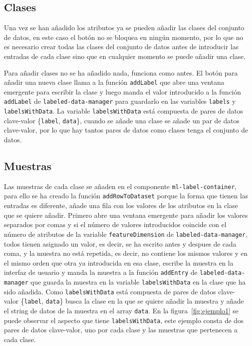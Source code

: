 \documentclass[a4paper, 12pt]{book}
\begin{document}
\subsection{Clases}
\label{subsec:clases}

Una vez se han añadido los atributos ya se pueden añadir las clases del conjunto de datos, en este caso el botón no se bloquea en ningún momento, por lo que no es necesario crear todas las clases del conjunto de datos antes de introducir las entradas de cada clase sino que en cualquier momento se puede añadir una clase. 

Para añadir clases no se ha añadido nada, funciona como antes. 
El botón para añadir una nueva clase llama a la función \texttt{addLabel} que abre una ventana emergente para escribir la clase y luego manda el valor introducido a la función \texttt{addLabel} de \texttt{labeled-data-manager} para guardarlo en las variables \texttt{labels} y \texttt{labelsWithData}. 
La variable \texttt{labelsWithData} está compuesta de pares de datos clave-valor \{\texttt{label}, \texttt{data}\}, cuando se añade una clase se añade un par de datos clave-valor, por lo que hay tantos pares de datos como clases tenga el conjunto de datos.

\subsection{Muestras}
\label{subsec:datos}

Las muestras de cada clase se añaden en el componente \texttt{ml-label-container}, para ello se ha creado la función \texttt{addRowToDataset} porque la forma que tienen las entradas es diferente, añade una fila con los valores de los atributos en la clase que se quiere añadir. 
Primero abre una ventana emergente para añadir los valores separados por comas y si el número de valores introducidos coincide con el número de atributos de la variable \texttt{featureDimension} de \texttt{labeled-data-manager}, todos tienen asignado un valor, es decir, se ha escrito antes y despues de cada coma, y la muestra no está repetida, es decir, no contiene los mismos valores y en el mismo orden que otra ya introducida en esa clase, escribe la muestra en la interfaz de usuario y manda la muestra a la función \texttt{addEntry} de \texttt{labeled-data-manager} que guarda la muestra en la variable \texttt{labelsWithData} en la clase que ha sido añadida. Como \texttt{labelsWithData} está compuesta de pares de datos clave-valor \{\texttt{label}, \texttt{data}\} busca la clase en la que se quiere añadir la muestra y añade el string de datos de la muestra en el array \texttt{data}. 
En la figura~\ref{fig:ejemplo1} se puede observar el aspecto que tiene \texttt{labelsWithData}, este ejemplo consta de dos pares de datos clave-valor, uno por cada clase y las muestras que pertenecen a cada clase.
\end{document}
